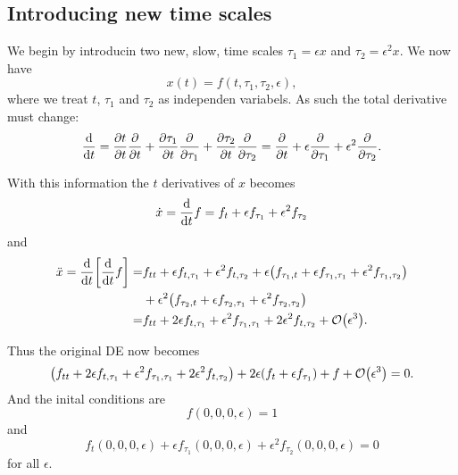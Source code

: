 \documentclass[11pt,letter, swedish, english
]{article}
\begin{document}
\subsection{Introducing new time scales}
We begin by introducin two new, slow, time scales $\tau_1=\epsilon x$
and $\tau_2=\epsilon^2 x$. We now have
\begin{equation}
x(t)=f(t, \tau_1, \tau_2, \epsilon),
\end{equation}
where we treat $t$, $\tau_1$ and $\tau_2$ as independen variabels. 
As such the total derivative must change:
\begin{equation}
\dv{t}=\pdv{t}{t}\pdv{t}+\pdv{\tau_1}{t}\pdv{\tau_1}
+\pdv{\tau_2}{t}\pdv{\tau_2}
=\pdv{t}+\epsilon\pdv{\tau_1}+\epsilon^2\pdv{\tau_2}. 
\end{equation}

With this information the $t$ derivatives of $x$ becomes
\begin{equation}
\dot{x}=\dv{t}f
=f_t + \epsilon f_{\tau_1}+\epsilon^2 f_{\tau_2}
\end{equation}
and
\begin{equation}
\begin{aligned}
\ddot{x}=\dv{t}\qty[\dv{t}f]
=&f_{tt}+\epsilon f_{t,\tau_1}+\epsilon^2 f_{t,\tau_2}
+\epsilon\qty(
f_{\tau_1,t}+\epsilon f_{\tau_1,\tau_1}+\epsilon^2f_{\tau_1,\tau_2})
\\ 
&+\epsilon^2\qty(
f_{\tau_2,t}+\epsilon f_{\tau_2,\tau_1}+\epsilon^2f_{\tau_2,\tau_2})
\\
=&f_{tt} + 2\epsilon f_{t,\tau_1} 
+ \epsilon^2 f_{\tau_1,\tau_1} + 2\epsilon^2 f_{t,\tau_2}
+\order{\epsilon^3}.
\end{aligned}
\end{equation}

Thus the original DE now becomes
\begin{equation}\label{eq:2_DE_f}
\qty(f_{tt} + 2\epsilon f_{t,\tau_1} 
+ \epsilon^2 f_{\tau_1,\tau_1} + 2\epsilon^2 f_{t,\tau_2})
+2\epsilon\qty(f_t + \epsilon f_{\tau_1})
+f+\order{\epsilon^3}=0.
\end{equation}
And the inital conditions are
\begin{equation}\label{eq:2_init}
f(0, 0, 0, \epsilon)=1
\end{equation}
and
\begin{equation}\label{eq:2_init_d0}
f_t(0, 0, 0, \epsilon) + \epsilon f_{\tau_1}(0, 0, 0,
\epsilon)+\epsilon^2 f_{\tau_2}(0, 0, 0, \epsilon)
=0
\end{equation}
for all $\epsilon$. 
\end{document}
